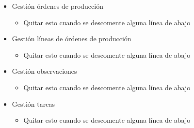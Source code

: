 \begin{itemize}
		\item Gestión órdenes de producción
		\begin{itemize}
			\item Quitar esto cuando se descomente alguna línea de abajo
		\end{itemize}
		\item Gestión líneas de órdenes de producción
		\begin{itemize}
			\item Quitar esto cuando se descomente alguna línea de abajo
		\end{itemize}
		\item Gestión observaciones
		\begin{itemize}
			\item Quitar esto cuando se descomente alguna línea de abajo
		\end{itemize}
		\item Gestión tareas
		\begin{itemize}
			\item Quitar esto cuando se descomente alguna línea de abajo
			
		\end{itemize}
	\end{itemize}	
